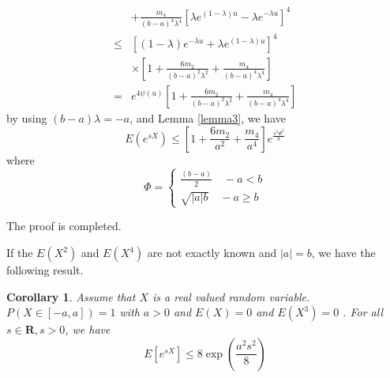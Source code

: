 \documentclass[journal]{IEEEtran}
\newtheorem{cor}{Corollary}
\begin{document}
\begin{IEEEproof}
 \begin{equation}
 \begin{split}
  & +\frac{m_4}{(b-a)^4\lambda^4}[\lambda e^{(1-\lambda)u}-\lambda e^{-\lambda u}]^4\\
  \leq &[(1-\lambda) e^{-\lambda u}+\lambda e^{(1-\lambda)u}]^4\\
  &\times [1+\frac{6m_2}{(b-a)^2\lambda^2}+\frac{m_4}{(b-a)^4\lambda^4}]\\
  =& e^{4\psi(u)}[1+\frac{6m_2}{(b-a)^2\lambda^2}+\frac{m_4}{(b-a)^4\lambda^4}]
    \end{split}
\end{equation}
by using $(b-a)\lambda=-a$, and Lemma \ref{lemma3}, we have
\begin{equation}
   E(e^{sX})\leq [1+\frac{6m_2}{a^2}+\frac{m_4}{a^4}]e^{\frac{s^2\Phi^2}{8}}
\end{equation}
where
\begin{equation}
  \Phi = \begin{cases} \frac{(b-a)}{2} \quad  -a<b \\
      \sqrt{|a|b}\quad -a \geq b
  \end{cases}
\end{equation}

The proof is completed.
\end{IEEEproof}
If the $E(X^2)$ and $E(X^4)$ are not exactly known and $|a|=b$, we have the following result.

\begin{cor}\label{cor k equal 4 and a=b}
Assume that $X$ is a real valued random variable.$P(X\in [-a, a])=1$ with $a>0$ and  $E(X)=0$ and $E(X^3)=0$ .  For all $s\in \textbf{R}, s>0$, we have
\begin{equation}
  E[e^{sX}]\leq 8 \exp(\frac{a^2s^2}{8})
  \end{equation}
\end{cor}
\end{document}
